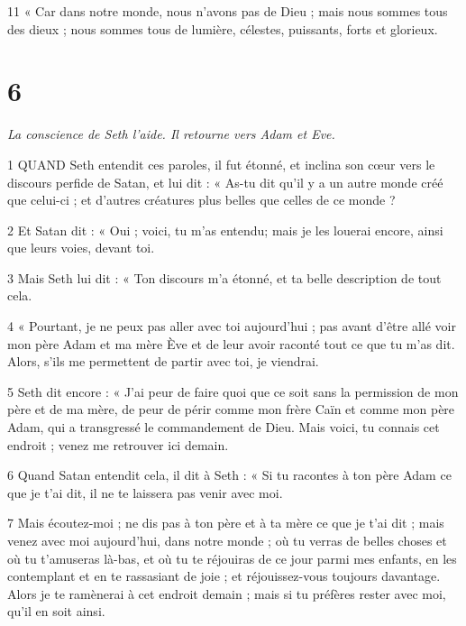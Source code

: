 \par 11 « Car dans notre monde, nous n'avons pas de Dieu ; mais nous sommes tous des dieux ; nous sommes tous de lumière, célestes, puissants, forts et glorieux.

\chapter{6}

\par \textit{La conscience de Seth l'aide. Il retourne vers Adam et Eve.}

\par 1 QUAND Seth entendit ces paroles, il fut étonné, et inclina son cœur vers le discours perfide de Satan, et lui dit : « As-tu dit qu'il y a un autre monde créé que celui-ci ; et d'autres créatures plus belles que celles de ce monde ?

\par 2 Et Satan dit : « Oui ; voici, tu m'as entendu; mais je les louerai encore, ainsi que leurs voies, devant toi.

\par 3 Mais Seth lui dit : « Ton discours m'a étonné, et ta belle description de tout cela.

\par 4 « Pourtant, je ne peux pas aller avec toi aujourd'hui ; pas avant d'être allé voir mon père Adam et ma mère Ève et de leur avoir raconté tout ce que tu m'as dit. Alors, s’ils me permettent de partir avec toi, je viendrai.

\par 5 Seth dit encore : « J'ai peur de faire quoi que ce soit sans la permission de mon père et de ma mère, de peur de périr comme mon frère Caïn et comme mon père Adam, qui a transgressé le commandement de Dieu. Mais voici, tu connais cet endroit ; venez me retrouver ici demain.

\par 6 Quand Satan entendit cela, il dit à Seth : « Si tu racontes à ton père Adam ce que je t'ai dit, il ne te laissera pas venir avec moi.

\par 7 Mais écoutez-moi ; ne dis pas à ton père et à ta mère ce que je t'ai dit ; mais venez avec moi aujourd'hui, dans notre monde ; où tu verras de belles choses et où tu t'amuseras là-bas, et où tu te réjouiras de ce jour parmi mes enfants, en les contemplant et en te rassasiant de joie ; et réjouissez-vous toujours davantage. Alors je te ramènerai à cet endroit demain ; mais si tu préfères rester avec moi, qu'il en soit ainsi.


